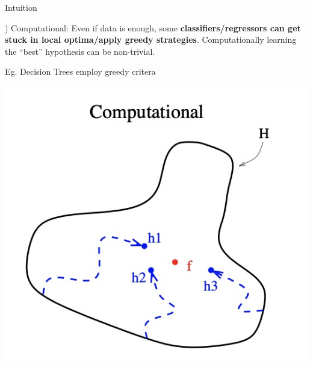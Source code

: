 \documentclass{beamer}
\begin{document}
\begin{frame}{Intuition}

  ) Computational: Even if data is enough, some \textbf{classifiers/regressors can get stuck in local optima/apply greedy strategies}. Computationally learning the ``best'' hypothesis can be non-trivial.

  \pause Eg. Decision Trees employ greedy critera

  \includegraphics[scale=0.2]{../assets/ensemble/diagrams/computational.jpg}

\end{frame}
  
\end{document}
